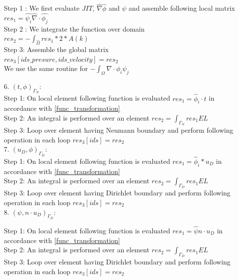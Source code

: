 \documentclass[a4paper,12pt]{book}
\begin{document}
Step 1 : We first evaluate $JIT$, $\hat{\nabla} \hat{\phi}$ and $\psi$ and assemble following local matrix\\
$res_1 = \hat{\psi_i} \hat{\nabla} \cdot \hat{\phi_j}$\\

Step 2 : We integrate the function over domain\\
$res_2 = -\int_{\hat{\Omega}} res_1 * 2 * A(k)$\\

Step 3: Assemble the global matrix\\
$res_3[ids\_presure,ids\_velocity] = res_2$\\

We use the same routine for $-\int_{\Omega} \nabla \cdot \phi_i \psi_j $

6. $(t,\phi)_{\Gamma_N}$:
\\

Step 1: On local element following function is evaluated $res_1=\hat{\phi}_i \cdot t$ in accordance with \ref{func_transformation}\\
Step 2: An integral is performed over an element $res_2=\int_{\Gamma_N} res_1 EL $\\
Step 3: Loop over element having Neumann boundary and perform following operation in each loop $res_3[ids]=res_2$\\

7. $(u_D,\phi)_{\Gamma_D}$:
\\

Step 1: On local element following function is evaluated $res_1=\hat{\phi}_i*u_D$ in accordance with \ref{func_transformation}\\
Step 2: An integral is performed over an element $res_2=\int_{\Gamma_D} res_1 EL $\\
Step 3: Loop over element having Dirichlet boundary and perform following operation in each loop $res_3[ids]=res_2$\\

8. $(\psi, n \cdot u_D)_{\Gamma_D} $:

Step 1: On local element following function is evaluated $res_1=\hat{\psi} n\cdot u_D$ in accordance with \ref{func_transformation}\\
Step 2: An integral is performed over an element $res_2=\int_{\Gamma_D} res_1 EL $\\
Step 3: Loop over element having Dirichlet boundary and perform following operation in each loop $res_3[ids]=res_2$\\
\end{document}
